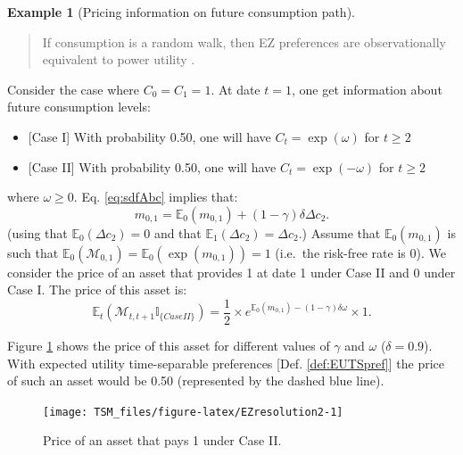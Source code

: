 \documentclass[
  12pt,
]{book}
\providecommand{\tightlist}{%
  \setlength{\itemsep}{0pt}\setlength{\parskip}{0pt}}
\theoremstyle{definition}
\theoremstyle{definition}
\newtheorem{example}{Example}[chapter]
\theoremstyle{definition}
\theoremstyle{definition}
\theoremstyle{remark}
\begin{document}
\begin{example}[Pricing information on future consumption path]
\begin{quote}
If consumption is a random walk, then EZ preferences are observationally equivalent to power utility \citep{Kocherlakota_1990}.
\end{quote}

Consider the case where \(C_0 = C_1 = 1\).
At date \(t=1\), one get information about future consumption levels:

\begin{itemize}
\tightlist
\item
  {[}Case I{]} With probability 0.50, one will have \(C_t=\exp(\omega)\) for \(t\ge2\)
\item
  {[}Case II{]} With probability 0.50, one will have \(C_t=\exp(-\omega)\) for \(t\ge2\)
\end{itemize}

where \(\omega \ge 0\).
Eq. \eqref{eq:sdfAbc} implies that:
\[
m_{0,1} = \mathbb{E}_0(m_{0,1}) + (1 - \gamma)\delta \Delta c_{2}.
\]
(using that \(\mathbb{E}_0(\Delta c_{2})=0\) and that \(\mathbb{E}_1(\Delta c_{2})=\Delta c_{2}\).)
Assume that \(\mathbb{E}_0(m_{0,1})\) is such that \(\mathbb{E}_0(\mathcal{M}_{0,1})=\mathbb{E}_0(\exp(m_{0,1}))=1\) (i.e.~the risk-free rate is 0).
We consider the price of an asset that provides 1 at date 1 under Case II and 0 under Case I.
The price of this asset is:
\[
\mathbb{E}_t(\mathcal{M}_{t,t+1}\mathbb{I}_{\{Case II\}}) = \frac{1}{2} \times e^{\mathbb{E}_0(m_{0,1}) - (1 - \gamma)\delta \omega} \times 1.
\]

Figure \ref{fig:EZresolution2} shows the price of this asset for different values of \(\gamma\) and \(\omega\) (\(\delta=0.9\)). With expected utility time-separable preferences {[}Def. \ref{def:EUTSpref}{]} the price of such an asset would be 0.50 (represented by the dashed blue line).

\begin{figure}
\texttt{[image: TSM\_files/figure-latex/EZresolution2-1]} \caption{Price of an asset that pays 1 under Case II.}\label{fig:EZresolution2}
\end{figure}

\end{example}
\end{document}
